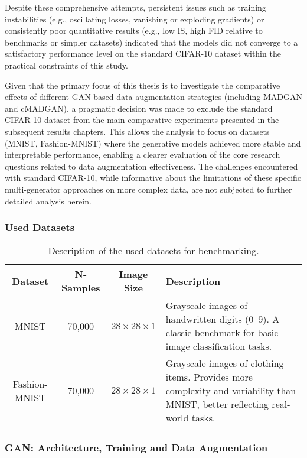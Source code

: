 Despite these comprehensive attempts, persistent issues such as training instabilities (e.g., oscillating losses, vanishing or exploding gradients) or consistently poor quantitative results (e.g., low IS, high FID relative to benchmarks or simpler datasets) indicated that the models did not converge to a satisfactory performance level on the standard CIFAR-10 dataset within the practical constraints of this study.

Given that the primary focus of this thesis is to investigate the comparative effects of different GAN-based data augmentation strategies (including MADGAN and cMADGAN), a pragmatic decision was made to exclude the standard CIFAR-10 dataset from the main comparative experiments presented in the subsequent results chapters. This allows the analysis to focus on datasets (MNIST, Fashion-MNIST) where the generative models achieved more stable and interpretable performance, enabling a clearer evaluation of the core research questions related to data augmentation effectiveness. The challenges encountered with standard CIFAR-10, while informative about the limitations of these specific multi-generator approaches on more complex data, are not subjected to further detailed analysis herein.

\subsubsection{Used Datasets}

\begin{table}[H]
    \centering
    \begin{tabular}{|c|c|c|p{7.5cm}|}
        \hline
        Dataset & N-Samples & Image Size & Description \\ \hline
        MNIST & 70,000  & $28 \times 28 \times 1$ & Grayscale images of handwritten digits (0–9). A classic benchmark for basic image classification tasks.\\ \hline
        Fashion-MNIST & 70,000  & $28 \times 28 \times 1$ & Grayscale images of clothing items. Provides more complexity and variability than MNIST, better reflecting real-world tasks.\\ \hline
    \end{tabular}
    \caption{Description of the used datasets for benchmarking.}
    \label{exp_setup_used_datasets}
\end{table}



\subsubsection{GAN: Architecture, Training and Data Augmentation}


